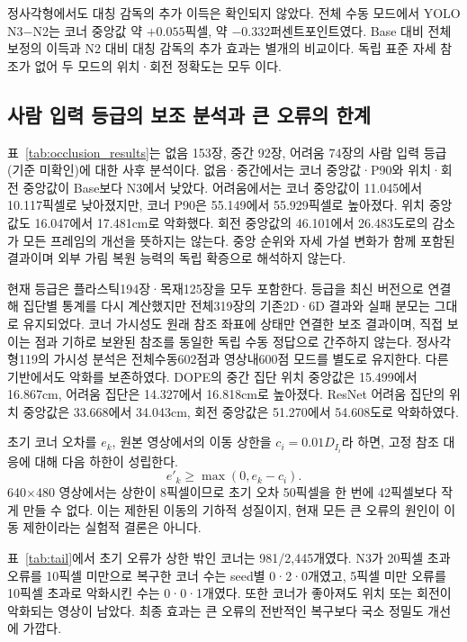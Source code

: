 정사각형에서도 대칭 감독의 추가 이득은 확인되지 않았다. 전체 수동 모드에서 YOLO N3−N2는 코너 중앙값 약 $+0.055$픽셀, \pckten 약 $-0.332$퍼센트포인트였다. Base 대비 전체 보정의 이득과 N2 대비 대칭 감독의 추가 효과는 별개의 비교이다. 독립 표준 자세 참조가 없어 두 모드의 위치·회전 정확도는 모두 \notrun 이다.

\subsection{사람 입력 등급의 보조 분석과 큰 오류의 한계}
표~\ref{tab:occlusion_results}는 없음 153장, 중간 92장, 어려움 74장의 사람 입력 등급(기준 미확인)에 대한 사후 분석이다. 없음·중간에서는 코너 중앙값·P90와 위치·회전 중앙값이 Base보다 N3에서 낮았다. 어려움에서는 코너 중앙값이 11.045에서 10.117픽셀로 낮아졌지만, 코너 P90은 55.149에서 55.929픽셀로 높아졌다. 위치 중앙값도 16.047에서 17.481cm로 악화했다. 회전 중앙값의 46.101에서 26.483도로의 감소가 모든 프레임의 개선을 뜻하지는 않는다. 중앙 순위와 자세 가설 변화가 함께 포함된 결과이며 외부 가림 복원 능력의 독립 확증으로 해석하지 않는다.


현재 등급은 플라스틱194장·목재125장을 모두 포함한다. 등급을 최신 버전으로 연결해 집단별 통계를 다시 계산했지만 전체319장의 기존2D·6D 결과와 실패 분모는 그대로 유지되었다. 코너 가시성도 원래 참조 좌표에 상태만 연결한 보조 결과이며, 직접 보이는 점과 기하로 보완된 참조를 동일한 독립 수동 정답으로 간주하지 않는다. 정사각형119의 가시성 분석은 전체수동602점과 영상내600점 모드를 별도로 유지한다. 다른 기반에서도 악화를 보존하였다. DOPE의 중간 집단 위치 중앙값은 15.499에서 16.867cm, 어려움 집단은 14.327에서 16.818cm로 높아졌다. ResNet 어려움 집단의 위치 중앙값은 33.668에서 34.043cm, 회전 중앙값은 51.270에서 54.608도로 악화하였다. 

초기 코너 오차를 $e_k$, 원본 영상에서의 이동 상한을 $c_i=0.01D_{I_i}$라 하면, 고정 참조 대응에 대해 다음 하한이 성립한다.
\begin{equation}
 e'_k\geq\max(0,e_k-c_i).
\end{equation}
640$\times$480 영상에서는 상한이 8픽셀이므로 초기 오차 50픽셀을 한 번에 42픽셀보다 작게 만들 수 없다. 이는 제한된 이동의 기하적 성질이지, 현재 모든 큰 오류의 원인이 이동 제한이라는 실험적 결론은 아니다.

표~\ref{tab:tail}에서 초기 오류가 상한 밖인 코너는 981/2,445개였다. N3가 20픽셀 초과 오류를 10픽셀 미만으로 복구한 코너 수는 seed별 0·2·0개였고, 5픽셀 미만 오류를 10픽셀 초과로 악화시킨 수는 0·0·1개였다. 또한 코너가 좋아져도 위치 또는 회전이 악화되는 영상이 남았다. 최종 효과는 큰 오류의 전반적인 복구보다 국소 정밀도 개선에 가깝다.


